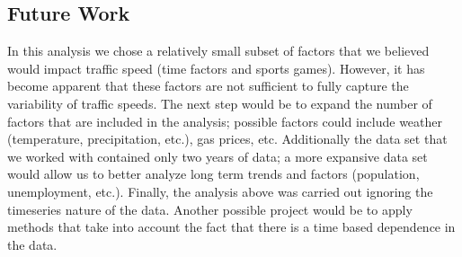 \documentclass[12pt]{article}
\begin{document}
\subsection{Future Work}
In this analysis we chose a relatively small subset of factors that we believed would impact traffic speed (time factors and sports games). However, it has become apparent that these factors are not sufficient to fully capture the variability of traffic speeds. The next step would be to expand the number of factors that are included in the analysis; possible factors could include weather (temperature, precipitation, etc.), gas prices, etc. Additionally the data set that we worked with contained only two years of data; a more expansive data set would allow us to better analyze long term trends and factors (population, unemployment, etc.). 
Finally, the analysis above was carried out ignoring the timeseries nature of the data. Another possible project would be to apply methods that take into account the fact that there is a time based dependence in the data.
\end{document}
